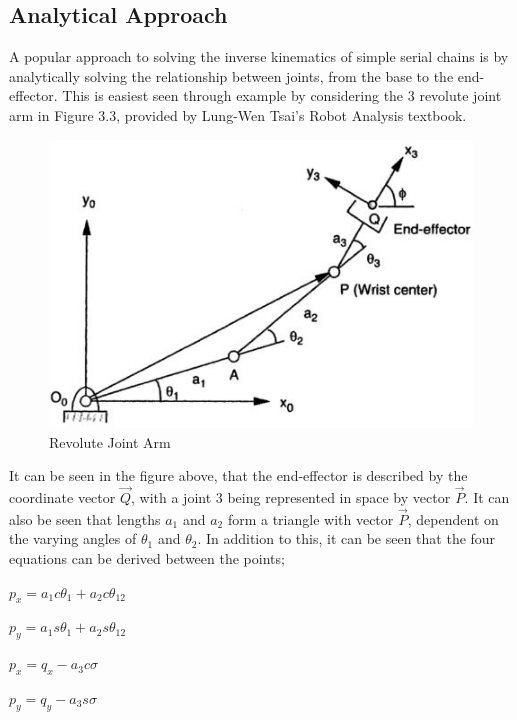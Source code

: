 \documentclass[12pt,openany,a4paper]{book}
\begin{document}
\subsection{Analytical Approach}

A popular approach to solving the inverse kinematics of simple serial chains is by analytically solving the relationship between joints, from the base to the end-effector. This is easiest seen through example by considering the 3 revolute joint arm in Figure 3.3, provided by Lung-Wen Tsai's Robot Analysis textbook.

\begin{center}
\begin{figure}[htb]
  \includegraphics[width=0.8\linewidth]{Tsai_3rr.jpg}
\caption{Revolute Joint Arm}
\end{figure}
\end{center}

It can be seen in the figure above, that the end-effector is described by the coordinate vector $\vec{Q}$, with a joint 3 being represented in space by vector $\vec{P}$. It can also be seen that lengths $a_1$ and $a_2$ form a triangle with vector $\vec{P}$, dependent on the varying angles of $\theta_1$ and $\theta_2$. In addition to this, it can be seen that the four equations can be derived between the points;

\vspace{\baselineskip}
\begin{center}
$p_x = a_1 c\theta_1 + a_2 c \theta_{12}$

$p_y = a_1 s\theta_1 + a_2 s \theta_{12}$

$p_x = q_x - a_3 c\sigma$

$p_y = q_y - a_3 s\sigma$
\end{center}
\vspace{\baselineskip}
\end{document}
